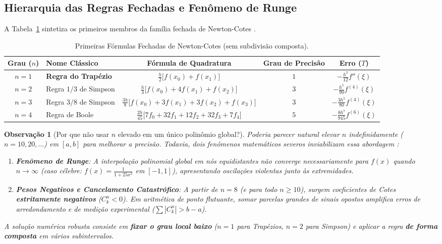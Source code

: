 \documentclass[11pt,a4paper]{article}
\newtheorem{observacao}{Observação}[section]
\begin{document}
\subsection{Hierarquia das Regras Fechadas e Fenômeno de Runge}
A Tabela~\ref{tab:newton_cotes} sintetiza os primeiros membros da família fechada de Newton-Cotes \cite{burden2016, chapra2016}.

\begin{table}[h!]
\centering
\caption{Primeiras Fórmulas Fechadas de Newton-Cotes (sem subdivisão composta).}
\label{tab:newton_cotes}
\small
\begin{tabular}{clccc}
\toprule
\textbf{Grau ($n$)} & \textbf{Nome Clássico} & \textbf{Fórmula de Quadratura} & \textbf{Grau de Precisão} & \textbf{Erro ($T$)} \\
\midrule
$n = 1$ & \textbf{Regra do Trapézio} & $\frac{h}{2}\big[f(x_0) + f(x_1)\big]$ & $1$ & $-\frac{h^3}{12} f''(\xi)$ \\
$n = 2$ & Regra $1/3$ de Simpson & $\frac{h}{3}\big[f(x_0) + 4f(x_1) + f(x_2)\big]$ & $3$ & $-\frac{h^5}{90} f^{(4)}(\xi)$ \\
$n = 3$ & Regra $3/8$ de Simpson & $\frac{3h}{8}\big[f(x_0) + 3f(x_1) + 3f(x_2) + f(x_3)\big]$ & $3$ & $-\frac{3h^5}{80} f^{(4)}(\xi)$ \\
$n = 4$ & Regra de Boole & $\frac{2h}{45}\big[7f_0 + 32f_1 + 12f_2 + 32f_3 + 7f_4\big]$ & $5$ & $-\frac{8h^7}{945} f^{(6)}(\xi)$ \\
\bottomrule
\end{tabular}
\end{table}

\begin{observacao}[Por que não usar $n$ elevado em um único polinômio global?]
Poderia parecer natural elevar $n$ indefinidamente ($n = 10, 20, \dots$) em $[a, b]$ para melhorar a precisão. Todavia, dois fenômenos matemáticos severos inviabilizam essa abordagem \cite{ruggiero1996, burden2016}:
\begin{enumerate}
    \item \textbf{Fenômeno de Runge}: A interpolação polinomial global em nós equidistantes não converge necessariamente para $f(x)$ quando $n \to \infty$ (caso célebre: $f(x) = \frac{1}{1 + 25x^2}$ em $[-1, 1]$), apresentando oscilações violentas junto às extremidades.
    \item \textbf{Pesos Negativos e Cancelamento Catastrófico}: A partir de $n = 8$ (e para todo $n \ge 10$), surgem coeficientes de Cotes \textbf{estritamente negativos} ($C_k^n < 0$). Em aritmética de ponto flutuante, somar parcelas grandes de sinais opostos amplifica erros de arredondamento e de medição experimental ($\sum |C_k^n| > b - a$).
\end{enumerate}
A solução numérica robusta consiste em \textbf{fixar o grau local baixo} ($n=1$ para Trapézios, $n=2$ para Simpson) e aplicar a regra \textbf{de forma composta} em vários subintervalos.
\end{observacao}
\end{document}
